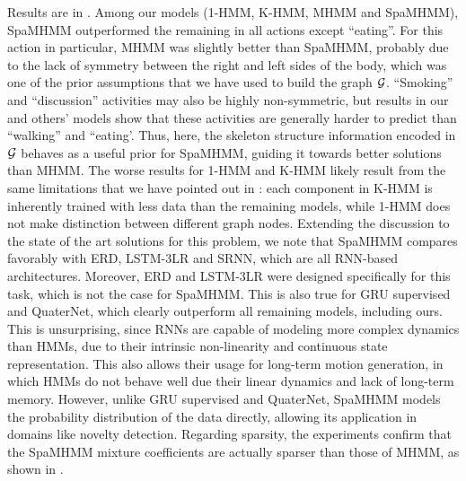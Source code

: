 Results are in . Among our models (1-HMM, K-HMM, MHMM and SpaMHMM), SpaMHMM outperformed the remaining in all actions except ``eating''. For this action in particular, MHMM was slightly better than SpaMHMM, probably due to the lack of symmetry between the right and left sides of the body, which was one of the prior assumptions that we have used to build the graph ${\mathcal{G}}$. ``Smoking'' and ``discussion'' activities may also be highly non-symmetric, but results in our and others' models show that these activities are generally harder to predict than ``walking'' and ``eating'. Thus, here, the skeleton structure information encoded in ${\mathcal{G}}$ behaves as a useful prior for SpaMHMM, guiding it towards better solutions than MHMM. The worse results for 1-HMM and K-HMM likely result from the same limitations that we have pointed out in : each component in K-HMM is inherently trained with less data than the remaining models, while 1-HMM does not make distinction between different graph nodes. Extending the discussion to the state of the art solutions for this problem, we note that SpaMHMM compares favorably with ERD, LSTM-3LR and SRNN, which are all RNN-based architectures. Moreover, ERD and LSTM-3LR were designed specifically for this task, which is not the case for SpaMHMM. This is also true for GRU supervised and QuaterNet, which clearly outperform all remaining models, including ours. This is unsurprising, since RNNs are capable of modeling more complex dynamics than HMMs, due to their intrinsic non-linearity and continuous state representation. This also allows their usage for long-term motion generation, in which HMMs do not behave well due their linear dynamics and lack of long-term memory. However, unlike GRU supervised and QuaterNet, SpaMHMM  models the probability distribution of the data directly, allowing its application in domains like novelty detection. Regarding sparsity, the experiments confirm that the SpaMHMM mixture coefficients are actually sparser than those of MHMM, as shown in .

